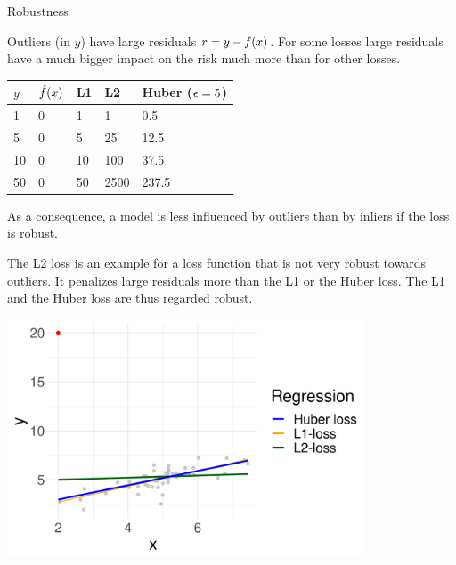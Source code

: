 \begin{vbframe}{Robustness}

Outliers (in $y$) have large residuals $r = y - f(x)$. For some losses large residuals have a much bigger impact on the risk much more than for other losses. 

\begin{table}[]
\begin{tabular}{lllll}
\toprule
$y$  & $\hat{f}(x)$ & L1 & L2 & Huber ($\epsilon = 5$) \\ \midrule 
1 & 0 & 1 & 1 & 0.5 \\ 
5 & 0 & 5 & 25 & 12.5 \\ 
10 & 0 & 10 & 100 & 37.5 \\ 
50 & 0 & 50 & 2500  & 237.5 \\ \bottomrule
\end{tabular}
\end{table}

As a consequence, a model is less influenced by outliers than by inliers if the loss is robust. 

\framebreak 

The L2 loss is an example for a loss function that is not very robust towards outliers. It penalizes large residuals more than the L1 or the Huber loss. The L1 and the Huber loss are thus regarded robust. 

\begin{center}
\includegraphics[width=0.8\textwidth]{figure/robustness.png}
\end{center}

\end{vbframe}

